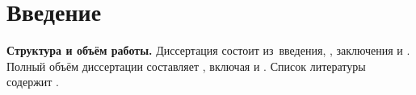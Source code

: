 \chapter*{Введение}

\newcommand{\actuality}{\textbf{Актуальность темы.}\enspace\ignorespaces}
\newcommand{\aim}{\textbf{Цель работы.}\enspace\ignorespaces}
\newcommand{\tasks}{\textbf{Задачи работы.}\enspace\ignorespaces}
\newcommand{\novelty}{\textbf{Научная новизна.}\enspace\ignorespaces}
\newcommand{\influence}{\textbf{Теоретическая и практическая значимость.}\enspace\ignorespaces}
\newcommand{\methods}{\textbf{Методы и инструменты исследования.}\enspace\ignorespaces}
\newcommand{\defpositions}{\textbf{Основные положения, выносимые на защиту.}\enspace\ignorespaces}
\newcommand{\relevance}{\textbf{Соответствие специальность.}\enspace\ignorespaces}
\newcommand{\reliability}{\textbf{Достоверность результатов проведённых исследований.}\enspace\ignorespaces}
\newcommand{\probation}{\textbf{Апробация работы.}\enspace\ignorespaces}
\newcommand{\contribution}{\textbf{Личный вклад автора.}\enspace\ignorespaces}
\newcommand{\publications}{\textbf{Публикации по теме диссертации.}\enspace\ignorespaces}
\newcommand{\structure}{\textbf{Структура и объём работы.}\enspace\ignorespaces}



\structure
Диссертация состоит из~введения,
,
заключения и
.
Полный объём диссертации составляет
, включая
 и
.
Список литературы содержит
.
